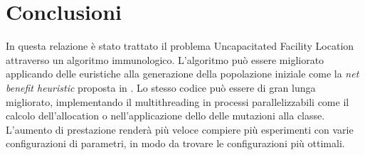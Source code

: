 \documentclass[a4paper,12pt,titlepage,oneside]{article}
\begin{document}
\section{Conclusioni}
In questa relazione è stato trattato il problema Uncapacitated Facility Location attraverso un algoritmo immunologico. L'algoritmo può essere migliorato applicando delle euristiche alla generazione della popolazione iniziale come la \textit{net benefit heuristic} proposta in \cite{Sultan1999}. Lo stesso codice può essere di gran lunga migliorato, implementando il multithreading in processi parallelizzabili come il calcolo dell'allocation o nell'applicazione dello delle mutazioni alla classe. L'aumento di prestazione renderà più veloce compiere più esperimenti con varie configurazioni di parametri, in modo da trovare le configurazioni più ottimali. 
\newpage
{}

\end{document}
